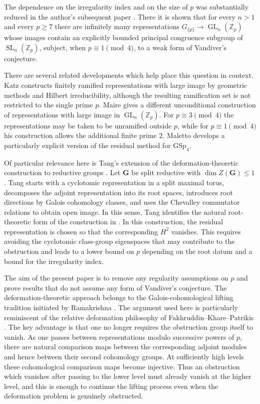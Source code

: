 \documentclass[11pt]{amsart}
\numberwithin{equation}{section}
\newcommand{\Zp}{\mathbb Z_p}
\newcommand{\GG}{\mathbf G}
\newcommand{\SL}{\operatorname{SL}}
\newcommand{\GL}{\operatorname{GL}}
\theoremstyle{definition}
\begin{document}
\par The dependence on the irregularity index and on the size of $p$ was
substantially reduced in the author's subsequent paper
\cite{Ray2023}. There it is shown that for every $n>1$ and every
$p\geq7$ there are infinitely many representations
$G_{\{p\}}\to\GL_n(\Zp)$ whose images contain an explicitly bounded
principal congruence subgroup of $\SL_n(\Zp)$, subject, when
$p\equiv1\pmod4$, to a weak form of Vandiver's conjecture.
\par There are several related developments which help place this question
in context. Katz \cite{Katz2019} constructs finitely ramified
representations with large image by geometric methods and Hilbert
irreducibility, although the resulting ramification set is not
restricted to the single prime $p$. Maire \cite{Maire2023} gives a
different unconditional construction of representations with large
image in $\GL_n(\Zp)$. For $p\equiv3\pmod4$ the representations may be
taken to be unramified outside $p$, while for
$p\equiv1\pmod4$ his construction allows the additional finite prime
$2$. Maletto \cite{Maletto2023} develops a particularly explicit
version of the residual method for $\mathrm{GSp}_4$.

\par Of particular relevance here is Tang's extension of the
deformation-theoretic construction to reductive groups
\cite{Tang2023}. Let $\GG$ be split reductive with
$\dim Z(\GG)\leq1$. Tang starts with a cyclotomic representation in a
split maximal torus, decomposes the adjoint representation into its
root spaces, introduces root directions by Galois cohomology classes,
and uses the Chevalley commutator relations to obtain open image. In
this sense, Tang identifies the natural root-theoretic form of the
construction in \cite{Ray2021}. In this construction, the residual representation is chosen so that
the corresponding $H^2$ vanishes. This requires avoiding the
cyclotomic class-group eigenspaces that may contribute to the
obstruction and leads to a lower bound on $p$ depending on the root
datum and a bound for the irregularity index.

\par The aim of the present paper is to remove any regularity assumptions
on $p$ and prove results that do not assume any form of Vandiver's
conjecture. The deformation-theoretic approach belongs to the
Galois-cohomological lifting tradition initiated by Ramakrishna
\cite{Ramakrishna1999}. The argument used here is particularly reminiscent
of the relative deformation philosophy of
Fakhruddin--Khare--Patrikis \cite{FKP2021}. The key advantage is that
one no longer requires the obstruction group itself to vanish. As one
passes between representations modulo successive powers of $p$, there
are natural comparison maps between the corresponding adjoint modules
and hence between their second cohomology groups. At sufficiently high
levels these cohomological comparison maps become injective. Thus an
obstruction which vanishes after passing to the lower level must
already vanish at the higher level, and this is enough to continue the
lifting process even when the deformation problem is genuinely
obstructed.
\end{document}
